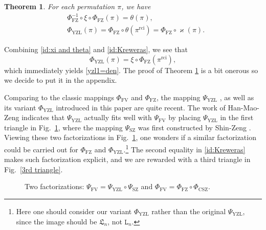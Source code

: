 \documentclass[12pt]{amsart}
\numberwithin{equation}{section}
\theoremstyle{plain}
\newtheorem{theorem}{Theorem}[section]
\theoremstyle{definition}
\def\FV{\mathrm{FV}}
\def\FZ{\mathrm{FZ}}
\def\YZL{\mathrm{YZL}}
\def\CSZ{\mathrm{CSZ}}
\def\SZ{\mathrm{SZ}}
\def\SS{\mathfrak{S}}
\def\rci{\mathrm{rci}}
\def\LH{\mathfrak{L}}
\begin{document}
\begin{theorem}\label{thm:yzl family}
For each permutation $\pi$, we have
\begin{align}\label{id:xi and theta}
&\Phi^{-1}_{\FZ}\circ \xi\circ \Phi_{\FZ}(\pi)=\theta(\pi),\\
&\Phi_{\YZL}(\pi)=\Phi_{\FZ}\circ\theta(\pi^{\rci})=\Phi_{\FZ}\circ\varkappa(\pi).
\label{id:Kreweras}
\end{align}
\end{theorem}
Combining \eqref{id:xi and theta} and \eqref{id:Kreweras}, we see that
$$\Phi_{\YZL}(\pi)=\xi\circ\Phi_{\FZ}(\pi^{\rci}),$$
which immediately yields \eqref{yzl1=den}. The proof of Theorem \ref{thm:yzl family} is a bit onerous so we decide to put it in the appendix.

Comparing to the classic mappings $\Phi_{\FV}$ and $\Phi_{\FZ}$, the mapping $\Psi_{\YZL}$ \cite{YZL}, as well as its variant $\Phi_{\YZL}$ introduced in this paper are quite recent. The work of Han-Mao-Zeng \cite{HMZ} indicates that $\Psi_{\YZL}$ actually fits well with $\Psi_{\FV}$ by placing $\Psi_{\YZL}$ in the first triangle in Fig.~\ref{two triangle}, where the mapping $\Psi_{\SZ}$ was first constructed by Shin-Zeng \cite{SZ12}. Viewing these two factorizations in Fig.~\ref{two triangle}, one wonders if a similar factorization could be carried out for $\Phi_{\FZ}$ and $\Phi_{\YZL}$.\footnote{Here one should consider our variant $\Phi_{\YZL}$ rather than the original $\Psi_{\YZL}$, since the image should be $\LH_n$, not $\mathtt{L}_n$.} The second equality in \eqref{id:Kreweras} makes such factorization explicit, and we are rewarded with a third triangle in Fig.~\ref{3rd triangle}.

\begin{figure}[htb]
\caption{Two factorizations: $\Psi_{\FV}=\Psi_{\YZL}\circ\Psi_{\SZ}$ and $\Phi_{\FV}=\Phi_{\FZ}\circ\Phi_{\CSZ}$. \label{two triangle}}
\end{figure}
\end{document}
